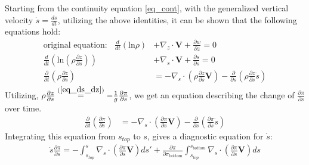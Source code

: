 Starting from the continuity equation \ref{eq_cont}, with the generalized vertical velocity $\dot{s}=\frac{ds}{dt}$, utilizing the above identities, it can be shown that the following equations hold:
\begin{align*}
\text{original equation:}~~~~ \frac{d}{dt}(\text{ln}\rho) &+ \nabla _z \cdot \textbf{V} + \frac{\partial w}{\partial z} = 0 \\
\frac{d}{dt}(\text{ln}(\rho\frac{\partial z}{\partial s})) &+ \nabla _s \cdot \textbf{V} + \frac{\partial \dot{s}}{\partial s} = 0\\
\frac{\partial}{\partial t}(\rho\frac{\partial z}{\partial s}) &= - \nabla _s \cdot (\rho\frac{\partial z}{\partial s}\textbf{V}) - \frac{\partial }{\partial s}(\rho\frac{\partial z}{\partial s}\dot{s})
\end{align*}
Utilizing, $\rho\frac{\partial z}{\partial s} \stackrel{(\ref{eq_ds_dz})}{=} - \frac{1}{g}\frac{\partial \pi}{\partial s}$, we get an equation describing the change of $\frac{\partial \pi}{\partial s}$ over time.
\begin{align*}
\frac{\partial}{\partial t}(\frac{\partial \pi}{\partial s}) &= - \nabla _s \cdot (\frac{\partial \pi}{\partial s}\textbf{V}) - \frac{\partial }{\partial s}(\frac{\partial \pi}{\partial s}\dot{s})
\end{align*}
Integrating this equation from $s_{top}$ to $s$, gives a diagnostic equation for $\dot{s}$:
\begin{align*}
\dot{s}\frac{\partial \pi}{\partial s} = -\int _{s_{top}}^s\nabla _s \cdot (\frac{\partial \pi}{\partial s}\textbf{V})ds' + \frac{\partial \pi}{\partial \pi_{\text{bottom}}} \int  _{s_{top}}^{s_{bottom}} \nabla _s \cdot (\frac{\partial \pi}{\partial s}\textbf{V}) ds
\end{align*}

